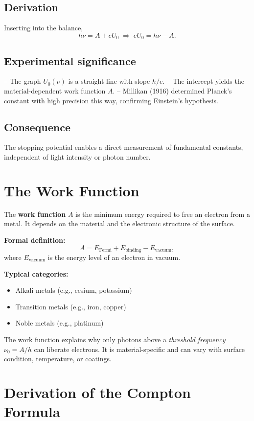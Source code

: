 \subsection*{Derivation}
Inserting into the balance,
\[
h\nu = A + eU_0 \;\Rightarrow\;
eU_0 = h\nu - A.
\]

\subsection*{Experimental significance}
– The graph \(U_0(\nu)\) is a straight line with slope \(h/e\).  
– The intercept yields the material-dependent work function \(A\).  
– Millikan (1916) determined Planck’s constant with high precision this way, confirming Einstein’s hypothesis.

\subsection*{Consequence}
The stopping potential enables a direct measurement of fundamental constants, independent of light intensity or photon number.

\section{The Work Function}
\label{anhangA:austrittsarbeit}

The \textbf{work function} \( A \) is the minimum energy required to free an electron from a metal. 
It depends on the material and the electronic structure of the surface. 

\textbf{Formal definition:}
\[
A = E_{\text{Fermi}} + E_{\text{binding}} - E_{\text{vacuum}},
\]
where \( E_{\text{vacuum}} \) is the energy level of an electron in vacuum.

\textbf{Typical categories:}
\begin{itemize}
	\item Alkali metals (e.g., cesium, potassium)
	\item Transition metals (e.g., iron, copper)
	\item Noble metals (e.g., platinum)
\end{itemize}

The work function explains why only photons above a \emph{threshold frequency} \( \nu_0 = A/h \) can liberate electrons. 
It is material-specific and can vary with surface condition, temperature, or coatings.

\section{Derivation of the Compton Formula}
\label{anhangA:comptonHerleitung}


